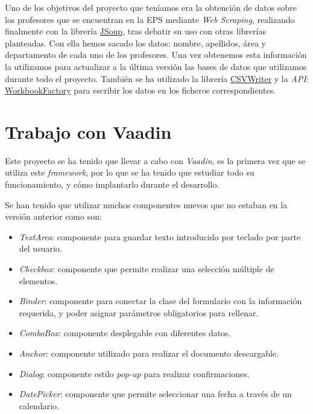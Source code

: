 Uno de los objetivos del proyecto que teníamos era la obtención de datos sobre los profesores que se encuentran en la EPS mediante \emph{Web Scraping}, realizando finalmente con la librería \href{https://jsoup.org/}{JSoup}, tras debatir su uso con otras librerías planteadas. 
Con ella hemos sacado los datos: nombre, apellidos, área y departamento de cada uno de los profesores. Una vez obtenemos esta información la utilizamos para actualizar a la última versión las bases de datos que utilizamos durante todo el proyecto.
También se ha utilizado la librería \href{https://opencsv.sourceforge.net/apidocs/com/opencsv/CSVWriter.html}{CSVWriter} y la \emph{API}: \href{https://poi.apache.org/apidocs/dev/org/apache/poi/ss/usermodel/WorkbookFactory.html}{WorkbookFactory} para escribir los datos en los ficheros correspondientes.

\section{Trabajo con Vaadin}

Este proyecto se ha tenido que llevar a cabo con \emph{Vaadin}, es la primera vez que se utiliza este \emph{framework}, por lo que se ha tenido que estudiar todo su funcionamiento, y cómo implantarlo durante el desarrollo.

Se han tenido que utilizar muchos componentes nuevos que no estaban en la versión anterior como son:

\begin{itemize}
	\item \emph{TextArea}: componente para guardar texto introducido por teclado por parte del usuario.
	\item \emph{Checkbox}: componente que permite realizar una selección múltiple de elementos.
	\item \emph{Binder}: componente para conectar la clase del formulario con la información requerida, y poder asignar parámetros obligatorios para rellenar.
	\item \emph{ComboBox}: componente desplegable con diferentes datos.
	\item \emph{Anchor}: componente utilizado para realizar el documento descargable.
	\item \emph{Dialog}: componente estilo \emph{pop-up} para realizar confirmaciones.
	\item \emph{DatePicker}: componente que permite seleccionar una fecha a través de un calendario.

\end{itemize}

